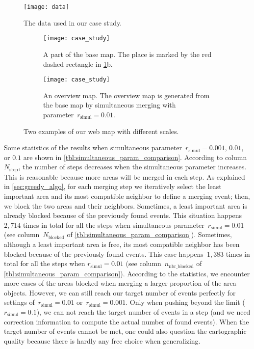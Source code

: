 \documentclass[twocolumn]{svjour3}          %
\begin{document}
\begin{figure}[tb]
\centering
\texttt{[image: data]}
\caption{The data used in our case study.}
\label{fig:data}
\end{figure}


\begin{figure}[tb]
\centering
\begin{subfigure}[t]{0.49\textwidth}
\centering
\texttt{[image: case\_study]}
\caption{A part of the base map. The place is marked 
    by the red dashed rectangle in \fig\ref{fig:data}b.}
\end{subfigure}
\newline
\vspace{0.5cm}
%
\begin{subfigure}[t]{0.49\textwidth}
\centering
\texttt{[image: case\_study]}
\caption{An overview map.
   The overview map is generated from the base map 
    by simultaneous merging with parameter~$r_\mathrm{simul}= 0.01$.}
\end{subfigure}
\caption{Two examples of our web map with different scales.
    }
\label{fig:web_map}
\end{figure}

Some statistics of the results when 
simultaneous parameter~$r_\mathrm{simul}=0.001$, $0.01$, or $0.1$ 
are shown in \tabl\ref{tbl:simultaneous_param_comparison}.
According to column~$N_\mathrm{step}$,
the number of steps decreases 
when the simultaneous parameter increases.
This is reasonable because more areas will be merged in each step.
As explained in \sect\ref{sec:greedy_algo}, 
for each merging step we iteratively select the least important area 
and its most compatible neighbor to define a merging event; 
then, we block the two areas and their neighbors.
Sometimes, a least important area is already blocked 
because of the previously found events.
This situation happens~$2{,}714$ times in total for all the steps
when simultaneous parameter~$r_\mathrm{simul}=0.01$
(see column~$N_\mathrm{blocked}$ of 
\tabl\ref{tbl:simultaneous_param_comparison}).
%
Sometimes, although a least important area is free, 
its most compatible neighbor has been blocked 
because of the previously found events.
This case happens~$1{,}383$ times in total for all the steps
when $r_\mathrm{simul}=0.01$
(see column~$n_\mathrm{nbr\_blocked}$ of 
\tabl\ref{tbl:simultaneous_param_comparison}).
%
According to the statistics, we encounter more cases of the areas blocked
when merging a larger proportion of the area objects.
However, we can still reach our target number of events perfectly 
for settings of~$r_\mathrm{simul}=0.01$ or~$r_\mathrm{simul}=0.001$. 
Only when pushing beyond the limit (\eg~$r_\mathrm{simul}=0.1$), 
we can not reach the target number of events in a step 
(and we need correction information 
to compute the actual number of found events). 
When the target number of events cannot be met, 
one could also question the cartographic quality 
because there is hardly any free choice when generalizing.
\end{document}
